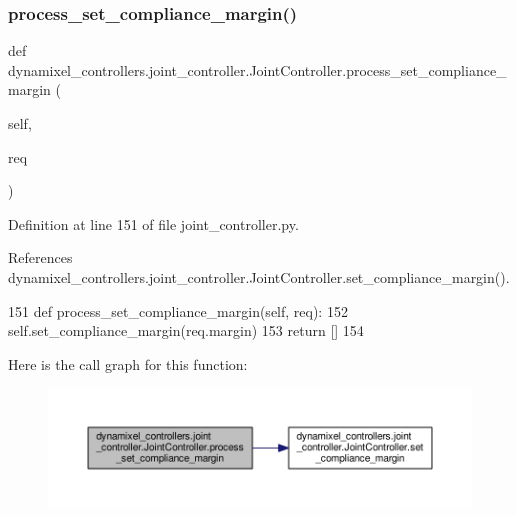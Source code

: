 \subsubsection{\texorpdfstring{process\+\_\+set\+\_\+compliance\+\_\+margin()}{process\_set\_compliance\_margin()}}
{\footnotesize\ttfamily def dynamixel\+\_\+controllers.\+joint\+\_\+controller.\+Joint\+Controller.\+process\+\_\+set\+\_\+compliance\+\_\+margin (\begin{DoxyParamCaption}\item[{}]{self,  }\item[{}]{req }\end{DoxyParamCaption})\hspace{0.3cm}{\ttfamily [inherited]}}



Definition at line 151 of file joint\+\_\+controller.\+py.



References dynamixel\+\_\+controllers.\+joint\+\_\+controller.\+Joint\+Controller.\+set\+\_\+compliance\+\_\+margin().


\begin{DoxyCode}
151     \textcolor{keyword}{def }process\_set\_compliance\_margin(self, req):
152         self.set\_compliance\_margin(req.margin)
153         \textcolor{keywordflow}{return} []
154 
\end{DoxyCode}
Here is the call graph for this function\+:
\nopagebreak
\begin{figure}[H]
\begin{center}
\leavevmode
\includegraphics[width=350pt]{d3/dcd/classdynamixel__controllers_1_1joint__controller_1_1_joint_controller_aed0bae387958b56f88fd707e9da9e8f1_cgraph}
\end{center}
\end{figure}
\mbox{\label{classdynamixel__controllers_1_1joint__controller_1_1_joint_controller_ac3d7aea8d47f24ab10c1162f34cce44f}} 
